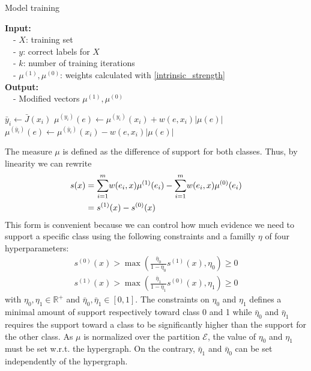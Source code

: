 \documentclass[sigconf,edbt]{acmart-edbt-workshops}
\begin{document}
\begin{algorithm}
  \caption{Model training}\label{training}
  \begin{flushleft}
  \textbf{Input:} \\
    ~~- $X$: training set \hfill\\
    ~~- $y$: correct labels for $X$\\
    ~~- $k$: number of training iterations\\
    ~~- $\mu^{(1)}, \mu^{(0)}$: weights calculated with \eqref{intrinsic_strength}\\
    \textbf{Output:} \\
    ~~- Modified vectors $\mu^{(1)}, \mu^{(0)}$
  \end{flushleft}
  \begin{algorithmic}[1]
      
          \State $\bar y_i \gets \bar J(x_i)$
              \State $\mu^{(y_i)}(e) \gets \mu^{(y_i)}(x_i) + w(e,x_i) |\mu(e)|$
              \State $\mu^{(\bar y_i)}(e) \gets \mu^{(\bar y_i)}(x_i) - w(e,x_i) |\mu(e)|$
            \EndFor
          \EndIf
        \EndFor
      \EndFor
  \end{algorithmic}
\end{algorithm}


The measure $\mu$ is defined as the difference of support for both classes. Thus, by linearity we can rewrite
\begin{align}
 \begin{split}
s(x) & = \underset{i = 1}{\overset{m}\sum} w({e}_i, {x}) \mu^{(1)}({e}_i) - \underset{i = 1}{\overset{m}\sum} w({e}_i, {x}) \mu^{(0)}({e}_i) \\
           & = s^{(1)}(x) - s^{(0)}(x)\hfill
 \end{split}
\end{align}
This form is convenient because we can control how much evidence we need to support a specific class using the following constraints and a familly $\eta$ of four hyperparameters:
\begin{subequations}
\begin{align}
  \tag{$C_0$}
  s^{(0)}(x) > \max(\frac{\bar \eta_0}{1 - \bar \eta_0}s^{(1)}(x), \eta_0) \geq 0\label{eqn:n0} \\
  \tag{$C_1$}
  s^{(1)}(x) > \max(\frac{\bar \eta_1}{1 - \bar \eta_1}s^{(0)}(x), \eta_1) \geq 0\label{eqn:n1}
\end{align}
\end{subequations} with $\eta_0, \eta_1 \in \mathbb{R}^+$ and $\bar \eta_0, \bar \eta_1 \in [0,1]$.
The constraints on $\eta_0$ and $\eta_1$ defines a minimal amount of support respectively toward class 0 and 1 while $\bar \eta_0$ and $\bar \eta_1$ requires the support toward a class to be significantly higher than the support for the other class.
As $\mu$ is normalized over the partition $\mathcal E$, the value of $\eta_0$ and $\eta_1$ must be set w.r.t. the hypergraph. On the contrary, $\bar \eta_1$ and $\bar \eta_0$ can be set independently of the hypergraph.
\end{document}
